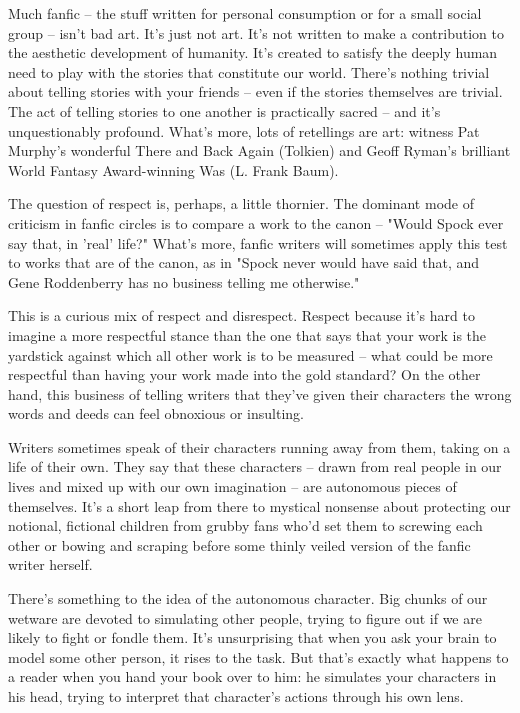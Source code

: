 Much fanfic -- the stuff written for personal consumption or for a
small social group -- isn't bad art. It's just not art. It's not
written to make a contribution to the aesthetic development of
humanity. It's created to satisfy the deeply human need to play
with the stories that constitute our world. There's nothing trivial
about telling stories with your friends -- even if the stories
themselves are trivial. The act of telling stories to one another
is practically sacred -- and it's unquestionably profound. What's
more, lots of retellings are art: witness Pat Murphy's wonderful
There and Back Again (Tolkien) and Geoff Ryman's brilliant World
Fantasy Award-winning Was (L. Frank Baum).

The question of respect is, perhaps, a little thornier. The
dominant mode of criticism in fanfic circles is to compare a work
to the canon -- "Would Spock ever say that, in 'real' life?" What's
more, fanfic writers will sometimes apply this test to works that
are of the canon, as in "Spock never would have said that, and Gene
Roddenberry has no business telling me otherwise."

This is a curious mix of respect and disrespect. Respect because
it's hard to imagine a more respectful stance than the one that
says that your work is the yardstick against which all other work
is to be measured -- what could be more respectful than having your
work made into the gold standard? On the other hand, this business
of telling writers that they've given their characters the wrong
words and deeds can feel obnoxious or insulting.

Writers sometimes speak of their characters running away from them,
taking on a life of their own. They say that these characters --
drawn from real people in our lives and mixed up with our own
imagination -- are autonomous pieces of themselves. It's a short
leap from there to mystical nonsense about protecting our notional,
fictional children from grubby fans who'd set them to screwing each
other or bowing and scraping before some thinly veiled version of
the fanfic writer herself.

There's something to the idea of the autonomous character. Big
chunks of our wetware are devoted to simulating other people,
trying to figure out if we are likely to fight or fondle them. It's
unsurprising that when you ask your brain to model some other
person, it rises to the task. But that's exactly what happens to a
reader when you hand your book over to him: he simulates your
characters in his head, trying to interpret that character's
actions through his own lens.

